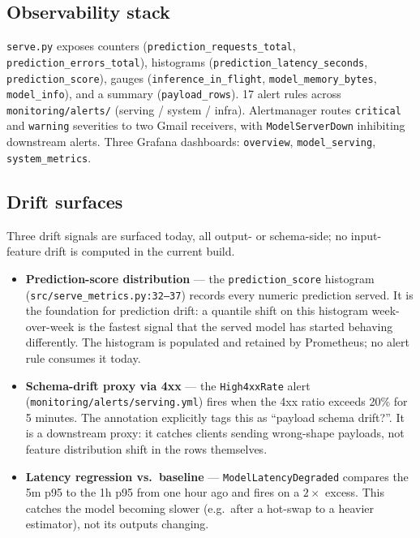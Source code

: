 \documentclass[11pt,a4paper]{article}
\begin{document}
\subsection{Observability stack}
\texttt{serve.py} exposes counters (\texttt{prediction\_requests\_total}, \texttt{prediction\_errors\_total}), histograms (\texttt{prediction\_latency\_seconds}, \texttt{prediction\_score}), gauges (\texttt{inference\_in\_flight}, \texttt{model\_memory\_bytes}, \texttt{model\_info}), and a summary (\texttt{payload\_rows}). 17 alert rules across \texttt{monitoring/alerts/} (serving / system / infra). Alertmanager routes \texttt{critical} and \texttt{warning} severities to two Gmail receivers, with \texttt{ModelServerDown} inhibiting downstream alerts. Three Grafana dashboards: \texttt{overview}, \texttt{model\_serving}, \texttt{system\_metrics}.

\subsection{Drift surfaces}

Three drift signals are surfaced today, all output- or schema-side; no input-feature drift is computed in the current build.

\begin{itemize}[leftmargin=1.5em,itemsep=0pt]
  \item \textbf{Prediction-score distribution} --- the \texttt{prediction\_score} histogram (\texttt{src/serve\_metrics.py:32--37}) records every numeric prediction served. It is the foundation for prediction drift: a quantile shift on this histogram week-over-week is the fastest signal that the served model has started behaving differently. The histogram is populated and retained by Prometheus; no alert rule consumes it today.
  \item \textbf{Schema-drift proxy via 4xx} --- the \texttt{High4xxRate} alert (\texttt{monitoring/alerts/serving.yml}) fires when the 4xx ratio exceeds 20\% for 5 minutes. The annotation explicitly tags this as ``payload schema drift?''. It is a downstream proxy: it catches clients sending wrong-shape payloads, not feature distribution shift in the rows themselves.
  \item \textbf{Latency regression vs.\ baseline} --- \texttt{ModelLatencyDegraded} compares the 5m p95 to the 1h p95 from one hour ago and fires on a $2\times$ excess. This catches the model becoming slower (e.g.\ after a hot-swap to a heavier estimator), not its outputs changing.
\end{itemize}
\end{document}
